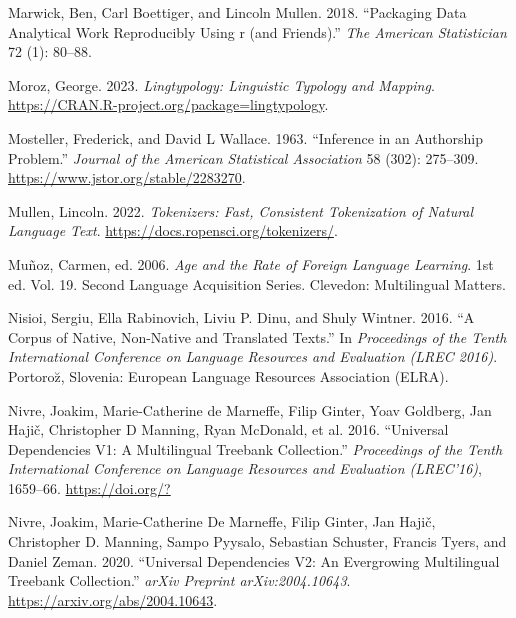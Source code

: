 \documentclass[
  letterpaper,
  DIV=11,
  numbers=noendperiod]{scrreport}
\newlength{\cslhangindent}
\newlength{\cslentryspacingunit} %
\newenvironment{CSLReferences}[2] %
 {%
  \setlength{\parindent}{0pt}
  \ifodd #1
  \let\oldpar\par
  \def\par{\hangindent=\cslhangindent\oldpar}
  \fi
  \setlength{\parskip}{#2\cslentryspacingunit}
 }%
 {}
\theoremstyle{definition}
\theoremstyle{remark}
\begin{document}
\begin{CSLReferences}{1}{0}
\leavevmode{}%
Marwick, Ben, Carl Boettiger, and Lincoln Mullen. 2018. {``Packaging
Data Analytical Work Reproducibly Using r (and Friends).''} \emph{The
American Statistician} 72 (1): 80--88.

\leavevmode{}%
Moroz, George. 2023. \emph{Lingtypology: Linguistic Typology and
Mapping}. \url{https://CRAN.R-project.org/package=lingtypology}.

\leavevmode{}%
Mosteller, Frederick, and David L Wallace. 1963. {``Inference in an
Authorship Problem.''} \emph{Journal of the American Statistical
Association} 58 (302): 275--309.
\url{https://www.jstor.org/stable/2283270}.

\leavevmode{}%
Mullen, Lincoln. 2022. \emph{Tokenizers: Fast, Consistent Tokenization
of Natural Language Text}. \url{https://docs.ropensci.org/tokenizers/}.

\leavevmode{}%
Muñoz, Carmen, ed. 2006. \emph{Age and the Rate of Foreign Language
Learning}. 1st ed. Vol. 19. Second Language Acquisition Series.
Clevedon: Multilingual Matters.

\leavevmode{}%
Nisioi, Sergiu, Ella Rabinovich, Liviu P. Dinu, and Shuly Wintner. 2016.
{``A Corpus of Native, Non-Native and Translated Texts.''} In
\emph{Proceedings of the Tenth International Conference on Language
Resources and Evaluation (LREC 2016)}. Portoro{z̆}, Slovenia: European
Language Resources Association (ELRA).

\leavevmode{}%
Nivre, Joakim, Marie-Catherine de Marneffe, Filip Ginter, Yoav Goldberg,
Jan Hajič, Christopher D Manning, Ryan McDonald, et al. 2016.
{``Universal Dependencies V1: A Multilingual Treebank Collection.''}
\emph{Proceedings of the Tenth International Conference on Language
Resources and Evaluation (LREC'16)}, 1659--66. \url{https://doi.org/?}

\leavevmode{}%
Nivre, Joakim, Marie-Catherine De Marneffe, Filip Ginter, Jan Hajič,
Christopher D. Manning, Sampo Pyysalo, Sebastian Schuster, Francis
Tyers, and Daniel Zeman. 2020. {``Universal Dependencies V2: An
Evergrowing Multilingual Treebank Collection.''} \emph{arXiv Preprint
arXiv:2004.10643}. \url{https://arxiv.org/abs/2004.10643}.


\end{CSLReferences}
\end{document}

